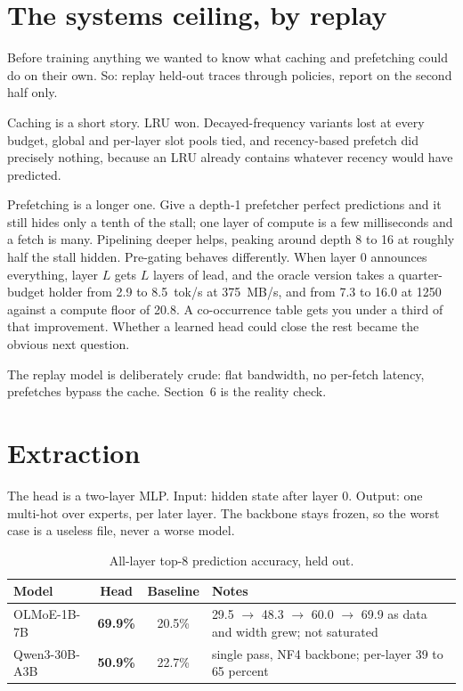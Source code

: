 \documentclass[11pt]{article}
\begin{document}
\section{The systems ceiling, by replay}
Before training anything we wanted to know what caching and prefetching could do on their own. So: replay held-out traces through policies, report on the second half only.

Caching is a short story. LRU won. Decayed-frequency variants lost at every budget, global and per-layer slot pools tied, and recency-based prefetch did precisely nothing, because an LRU already contains whatever recency would have predicted.

Prefetching is a longer one. Give a depth-1 prefetcher perfect predictions and it still hides only a tenth of the stall; one layer of compute is a few milliseconds and a fetch is many. Pipelining deeper helps, peaking around depth 8 to 16 at roughly half the stall hidden. Pre-gating behaves differently. When layer 0 announces everything, layer $L$ gets $L$ layers of lead, and the oracle version takes a quarter-budget holder from 2.9 to 8.5~tok/s at 375~MB/s, and from 7.3 to 16.0 at 1250 against a compute floor of 20.8. A co-occurrence table gets you under a third of that improvement. Whether a learned head could close the rest became the obvious next question.

The replay model is deliberately crude: flat bandwidth, no per-fetch latency, prefetches bypass the cache. Section~6 is the reality check.

\section{Extraction}
The head is a two-layer MLP. Input: hidden state after layer 0. Output: one multi-hot over experts, per later layer. The backbone stays frozen, so the worst case is a useless file, never a worse model.

\begin{table}[h]
\centering\small
\begin{tabular}{lccl}
\toprule
Model & Head & Baseline & Notes \\
\midrule
OLMoE-1B-7B & \textbf{69.9\%} & 20.5\% & 29.5 $\to$ 48.3 $\to$ 60.0 $\to$ 69.9 as data and width grew; not saturated \\
Qwen3-30B-A3B & \textbf{50.9\%} & 22.7\% & single pass, NF4 backbone; per-layer 39 to 65 percent \\
\bottomrule
\end{tabular}
\caption{All-layer top-8 prediction accuracy, held out.}
\end{table}
\end{document}
